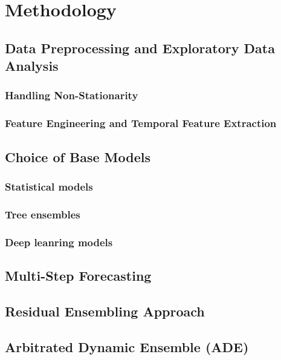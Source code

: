 \chapter{Methodology}

\section{Data Preprocessing and Exploratory Data Analysis} 
\subsection{Handling Non-Stationarity} %
\subsection{Feature Engineering and Temporal Feature Extraction} %


\section{Choice of Base Models}
\subsection{Statistical models}
\subsection{Tree ensembles}
\subsection{Deep leanring models}


\section{Multi-Step Forecasting}


\section{Residual Ensembling Approach}


\section{Arbitrated Dynamic Ensemble (ADE)}
